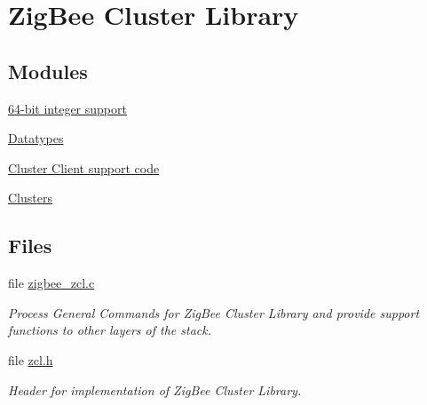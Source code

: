 \hypertarget{group__zcl}{}\section{Zig\+Bee Cluster Library}
\label{group__zcl}
\subsection*{Modules}
\begin{DoxyCompactItemize}
\item 
\hyperlink{group__zcl__64}{64-\/bit integer support}
\item 
\hyperlink{group__zcl__types}{Datatypes}
\item 
\hyperlink{group__zcl__client}{Cluster Client support code}
\item 
\hyperlink{group__zcl__clusters}{Clusters}
\end{DoxyCompactItemize}
\subsection*{Files}
\begin{DoxyCompactItemize}
\item 
file \hyperlink{zigbee__zcl_8c}{zigbee\+\_\+zcl.\+c}
\begin{DoxyCompactList}\small\item\em Process General Commands for Zig\+Bee Cluster Library and provide support functions to other layers of the stack. \end{DoxyCompactList}\item 
file \hyperlink{zcl_8h}{zcl.\+h}
\begin{DoxyCompactList}\small\item\em Header for implementation of Zig\+Bee Cluster Library. \end{DoxyCompactList}\end{DoxyCompactItemize}
